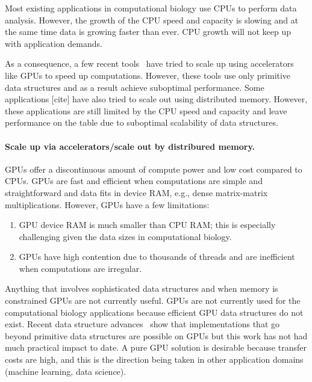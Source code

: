 Most existing applications in computational biology use CPUs to perform data
analysis. However, the growth of the CPU speed and capacity is slowing and at
the same time data is growing faster than ever. CPU growth will not keep up with
application demands.

As a consequence, a few recent tools~\cite{cite-something} have tried to scale
up using accelerators like GPUs to speed up computations. However, these tools
use only primitive data structures and as a result achieve suboptimal
performance. Some applications [cite] have also tried to scale out using
distributed memory.  However, these applications are still limited by the CPU
speed and capacity and leave performance on the table due to suboptimal
scalability of data structures.


\paragraph{Scale up via accelerators/scale out by distribured memory.}

GPUs offer a discontinuous amount of compute power and low cost compared to
CPUs. GPUs are fast and efficient when computations are simple and
straightforward and data fits in device RAM, e.g., dense matrix-matrix
multiplications.
However, GPUs have a few limitations:
\begin{enumerate}[noitemsep, leftmargin=*]
  \item GPU device RAM is much smaller than CPU RAM; this is especially
    challenging given the data sizes in computational biology.
  \item GPUs have high contention due to thousands of threads and are
    inefficient when computations are irregular.
\end{enumerate}

Anything that involves sophisticated data structures and when memory is
constrained GPUs are not currently useful.  GPUs are not currently used for the
computational biology applications because efficient GPU data structures do not
exist. Recent data structure advances~\cite{cite-something} show that
implementations that go beyond primitive data structures are possible on GPUs
but this work has not had much practical impact to date. A pure GPU solution is
desirable because transfer costs are high, and this is the direction being taken
in other application domains (machine learning, data science).



